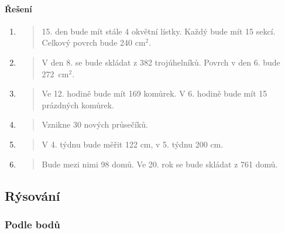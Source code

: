 \newpage

\paragraph{Řešení}
\begin{enumerate}
    \item
    \begin{quote}
        15. den bude mít stále 4 okvětní lístky. Každý bude mít 15 sekcí. Celkový povrch bude 240 cm$^{2}$.
    \end{quote}

    \item
    \begin{quote}
        V den 8. se bude skládat z 382 trojúhelníků. Povrch v den 6. bude 272~cm$^{2}$.
    \end{quote}

    \item
    \begin{quote}
        Ve 12. hodině bude mít 169 komůrek. V 6. hodině bude mít 15 prázdných komůrek.
    \end{quote}

    \item
    \begin{quote}
        Vznikne 30 nových průsečíků.
    \end{quote}

    \item
    \begin{quote}
        V 4. týdnu bude měřit 122 cm, v 5. týdnu 200 cm.
    \end{quote}

    \item
    \begin{quote}
        Bude mezi nimi 98 domů. Ve 20. rok se bude skládat z 761 domů.
    \end{quote}
\end{enumerate}

\newpage

\subsection{Rýsování}
\label{subsec:rysovani}

\subsubsection{Podle bodů}

